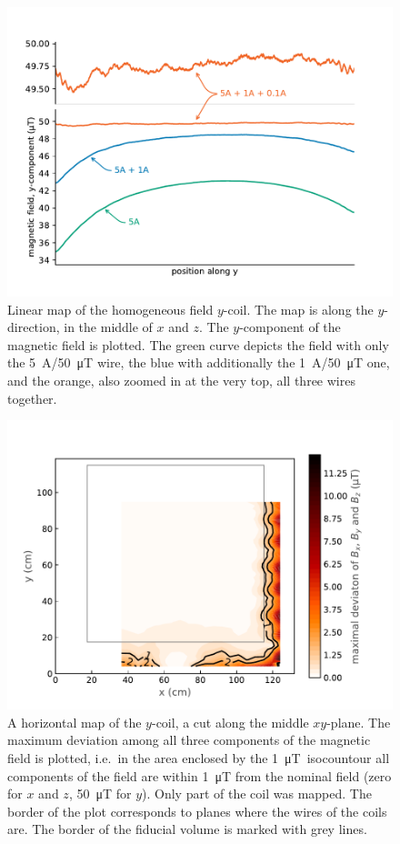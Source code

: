 \begin{figure}
  \centering
  \includegraphics[width=0.9\linewidth]{gfx/prototype/y_scan_all_double.pdf}
  \caption{Linear map of the homogeneous field $y$-coil. The map is along the $y$-direction, in the middle of $x$ and $z$. The $y$-component of the magnetic field is plotted. The green curve depicts the field with only the \SI{5}{\ampere}/\SI{50}{\micro\tesla} wire, the blue with additionally the \SI{1}{\ampere}/\SI{50}{\micro\tesla} one, and the orange, also zoomed in at the very top, all three wires together.}\label{fig:prototype_linear_map}
\end{figure}

\begin{figure}
  \centering
  \includegraphics[width=\linewidth]{gfx/prototype/planar_map_Y_max_deviation.pdf}
  \caption{A horizontal map of the $y$-coil, a cut along the middle $xy$-plane. The maximum deviation among all three components of the magnetic field is plotted, i.e.\ in the area enclosed by the \SI{1}{\micro\tesla}~isocountour all components of the field are within \SI{1}{\micro\tesla} from the nominal field (zero for $x$ and $z$, \SI{50}{\micro\tesla} for $y$). Only part of the coil was mapped. The border of the plot corresponds to planes where the wires of the coils are. The border of the fiducial volume is marked with grey lines.}\label{fig:prototype_plane_map}
\end{figure}

